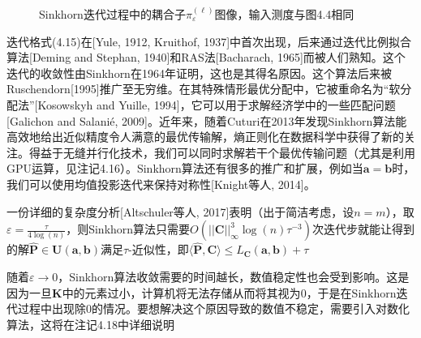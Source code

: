 \documentclass[cn,10pt,math=newtx,citestyle=gb7714-2015,bibstyle=gb7714-2015]{elegantbook}
\begin{document}
\begin{figure}[H]
\begin{minipage}{0.8\linewidth}
\begin{minipage}{0.16\linewidth}
\begin{mdframed}
		\end{mdframed}
		\caption*{$\ell=5000$}
	\end{minipage}
	\end{minipage}
	\vspace{.5em}
	\caption{Sinkhorn迭代过程中的耦合子$\pi_\varepsilon^{(\ell)}$图像，输入测度与图4.4相同}
	\label{图4.5}
\end{figure}

\begin{postulate}[研究历史]
迭代格式(4.15)在[Yule, 1912, Kruithof, 1937]中首次出现，后来通过迭代比例拟合算法[Deming and Stephan, 1940]和RAS法[Bacharach, 1965]而被人们熟知。这个迭代的收敛性由Sinkhorn在1964年证明，这也是其得名原因。这个算法后来被Ruschendorn[1995]推广至无穷维。在其特殊情形最优分配中，它被重命名为“软分配法”[Kosowskyh and Yuille, 1994]，它可以用于求解经济学中的一些匹配问题[Galichon and Salani\'e, 2009]。近年来，随着Cuturi在2013年发现Sinkhorn算法能高效地给出近似精度令人满意的最优传输解，熵正则化在数据科学中获得了新的关注。得益于无缝并行化技术，我们可以同时求解若干个最优传输问题（尤其是利用GPU运算，见注记4.16）。Sinkhorn算法还有很多的推广和扩展，例如当$\mathbf{a=b}$时，我们可以使用均值投影迭代来保持对称性[Knight等人, 2014]。
\end{postulate}

\begin{postulate}[总体复杂度]
一份详细的复杂度分析[Altschuler等人, 2017]表明（出于简洁考虑，设$n=m$），取$\varepsilon=\frac{\tau}{4\log(n)}$，则Sinkhorn算法只需要$O(||\mathbf{C}||_\infty^3 \log(n) \tau^{-3})$次迭代步就能让得到的解$\mathbf{\hat{P}}\in\mathbf{U(a,b)}$满足$\tau$-近似性，即$\langle \mathbf{\hat{P}}, \mathbf{C} \rangle \leq L_\mathbf{C}(\mathbf{a,b})+\tau$
\end{postulate}

\begin{postulate}[Sinkhorn算法的数值稳定性]
随着$\varepsilon \to 0$，Sinkhorn算法收敛需要的时间越长，数值稳定性也会受到影响。这是因为一旦$\mathbf{K}$中的元素过小，计算机将无法存储从而将其视为$0$，于是在Sinkhorn迭代过程中出现除$0$的情况。要想解决这个原因导致的数值不稳定，需要引入对数化算法，这将在注记4.18中详细说明
\end{postulate}
\end{document}

